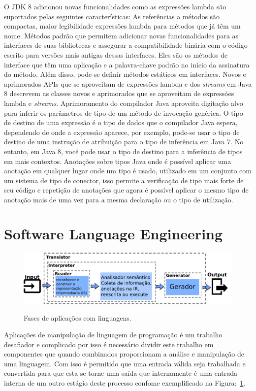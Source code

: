 O \acs{JDK} 8 adicionou novas funcionalidades como as expressões lambda são suportados pelas seguintes características: As referências a métodos são compactas, maior legibilidade expressões lambda para métodos que já têm um nome. Métodos padrão que permitem adicionar novas funcionalidades para as interfaces de suas bibliotecas e assegurar a compatibilidade binária com o código escrito para versões mais antigas dessas interfaces. Eles são os métodos de interface que têm uma aplicação e a palavra-chave padrão no início da assinatura do método. Além disso, pode-se definir métodos estáticos em interfaces. Novos e aprimorados APIs que se aproveitam de expressões lambda e dos {\it streams} em Java 8 descrevem as classes novos e aprimorados que se aproveitam de expressões lambda e {\it streams}. Aprimoramento do compilador Java aproveita digitação alvo para inferir os parâmetros de tipo de um método de invocação genérica. O tipo de destino de uma expressão é o tipo de dados que o compilador Java espera, dependendo de onde a expressão aparece, por exemplo, pode-se usar o tipo de destino de uma instrução de atribuição para o tipo de inferência em Java 7. No entanto, em Java 8, você pode usar o tipo de destino para a inferência de tipos em mais contextos. Anotações sobre tipos Java onde é possível aplicar uma anotação em qualquer lugar onde um tipo é usado, utilizado em um conjunto com um sistema de tipo de conector, isso permite a verificação de tipo mais forte de seu código e repetição de anotações que agora é possível aplicar o mesmo tipo de anotação mais de uma vez para a mesma declaração ou o tipo de utilização.

\section{Software Language Engineering}\label{sec:softEng}

\begin{figure}[h]
	\center
	\includegraphics[scale=0.9]{Imagens/stagesLanguageApp}
	\label{fig:stagesLanguageApp}
	\caption{Fases de aplicações com linguagens.}
\end{figure}

Aplicações de manipulação de linguagem de programação é um trabalho desafiador e complicado por isso é necessário dividir este trabalho em componentes que quando combinados proporcionam a análise e manipulação de uma linguagem. Com isso é permitido que uma entrada válida seja trabalhada e convertida para que esta se torne uma saída que internamente é uma entrada interna de um outro estágio deste processo confome exemplificado na Figura:~\ref{fig:stagesLanguageApp}. 

